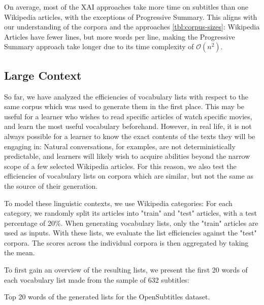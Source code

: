 On average, most of the XAI approaches take more time on subtitles than one Wikipedia articles, with the exceptions of Progressive Summary.
This aligns with our understanding of the corpora and the approaches \ref{tbl:corpus-sizes}:
Wikipedia Articles have fewer lines, but more words per line, making the Progressive Summary approach take longer due to its time complexity of $\mathcal{O}(n^2)$.



\subsection{Large Context} \label{sec:results-large-context}
So far, we have analyzed the efficiencies of vocabulary lists with respect to the same corpus which was used to generate them in the first place.
This may be useful for a learner who wishes to read specific articles of watch specific movies, and learn the most useful vocabulary beforehand.
However, in real life, it is not always possible for a learner to know the exact contents of the texts they will be engaging in:
Natural conversations, for examples, are not deterministically predictable, and learners will likely wish to acquire abilities beyond the narrow scope of a few selected Wikipedia articles.
For this reason, we also test the efficiencies of vocabulary lists on corpora which are similar, but not the same as the source of their generation.

To model these linguistic contexts, we use Wikipedia categories:
For each category, we randomly split its articles into "train" and "test" articles, with a test percentage of 20\%.
When generating vocabulary lists, only the "train" articles are used as inputs.
With these lists, we evaluate the list efficiencies against the "test" corpora.
The scores across the individual corpora is then aggregated by taking the mean.

To first gain an overview of the resulting lists, we present the first 20 words of each vocabulary list made from the sample of 632 subtitles:

\begin{table}[H]
	\centering
	
	\caption{Top 20 words of the generated lists for the OpenSubtitles dataset.}
	\label{tbl:first-k-words-opensubs}
\end{table}

